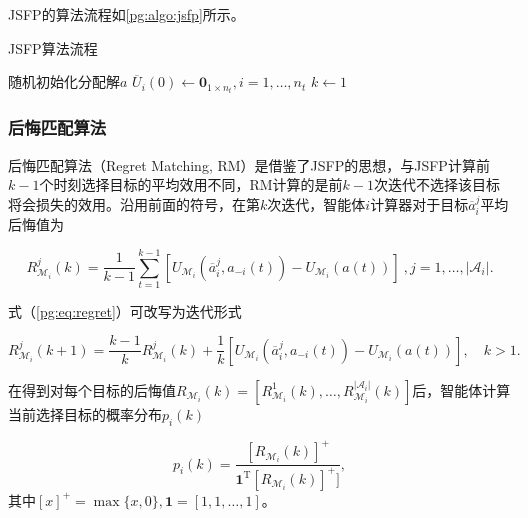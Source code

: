 JSFP的算法流程如\ref{pg:algo:jsfp}所示。

\begin{algorithm}[htb]
	\caption{JSFP算法流程}
	\label{pg:algo:jsfp}
	\small
	\SetAlgoLined
	随机初始化分配解$a$\;
	${\overline U}_i(0) \gets {\bm 0}_{1 \times n_t},i=1,\dots,n_t$\;
	$k \gets 1$\;
	
\end{algorithm}


\subsubsection{后悔匹配算法}
\label{pgta:protocal:RM}

后悔匹配算法（Regret Matching, RM）是借鉴了JSFP的思想，与JSFP计算前$k-1$个时刻选择目标的平均效用不同，RM计算的是前$k-1$次迭代不选择该目标将会损失的效用。沿用前面的符号，在第$k$次迭代，智能体$i$计算器对于目标$\overline a_i^j$平均后悔值为

\begin{equation}
\label{pg:eq:regret}
	R_{\mathcal{M}_i}^j(k) = \frac{1}{k-1}\sum_{t=1}^{k-1} [U_{\mathcal{M}_i}(\overline a_i^j, a_{-i}(t)) - U_{\mathcal{M}_i}(a(t))]\ ,j=1,\dots,|\mathcal{A}_i|.
\end{equation}

式（\ref{pg:eq:regret}）可改写为迭代形式

\begin{equation}
\label{pg:eq:recurRM}
	R_{\mathcal{M}_i}^j(k+1) = \frac{k-1}{k}R_{\mathcal{M}_i}^j(k) + \frac{1}{k} [U_{\mathcal{M}_i}(\overline a_i^j, a_{-i}(t)) - U_{\mathcal{M}_i}(a(t))],\quad k>1.
\end{equation}

在得到对每个目标的后悔值$R_{\mathcal{M}_i}(k)=[R_{\mathcal{M}_i}^1(k),\dots,R_{\mathcal{M}_i}^{|\mathcal{A}_i|}(k)]$后，智能体计算当前选择目标的概率分布$p_i(k)$

\begin{equation}
\label{pg:eq:rmpdf}
	p_i(k) = \frac{[R_{\mathcal{M}_i}(k)]^+}{{\bm 1}^{\mathrm T}[R_{\mathcal{M}_i}(k)]^+]},
\end{equation}
其中$[x]^+=\max\{x,0\},{\bm 1}=[1,1,\dots,1]$。

